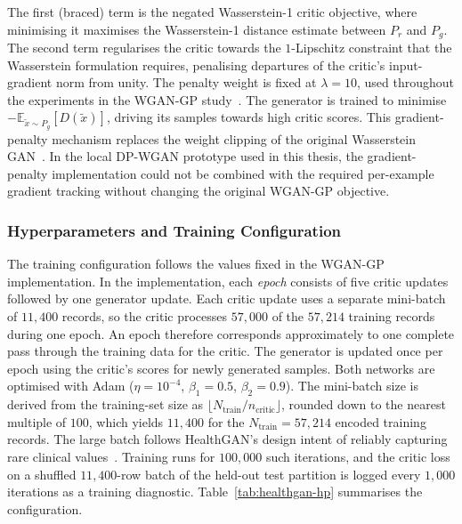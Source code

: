 The first (braced) term is the negated Wasserstein-1 critic objective, where
minimising it maximises the Wasserstein-1 distance estimate between $P_r$
and $P_g$. The second term regularises the critic towards the $1$-Lipschitz
constraint that the Wasserstein formulation requires, penalising departures
of the critic's input-gradient norm from unity. The penalty weight is fixed
at $\lambda = 10$, used throughout the
experiments in the WGAN-GP study~\cite{Gulrajani2017WGANGP}.
The generator is trained to minimise
$-\mathbb{E}_{\tilde{x}\sim P_g}\!\left[D(\tilde{x})\right]$, driving its
samples towards high critic scores. This
gradient-penalty mechanism replaces the weight clipping of the original
Wasserstein GAN~\cite{Arjovsky2017WGAN}. In the local DP-WGAN prototype used in this thesis, 
the gradient-penalty
implementation could not be combined with the required per-example gradient
tracking without changing the original WGAN-GP objective.

\subsubsection{Hyperparameters and Training Configuration}
\label{sec:methods:healthgan:hp}

The training configuration follows the values fixed in the WGAN-GP
implementation. In the implementation, each \emph{epoch} consists of five critic updates
followed by one generator update. Each critic update uses a separate
mini-batch of $11{,}400$ records, so the critic processes $57{,}000$ of the
$57{,}214$ training records during one epoch. An epoch therefore corresponds
approximately to one complete pass through the training data for the critic.
The generator is updated once per epoch using the critic's scores for newly
generated samples. Both networks are optimised
with Adam ($\eta = 10^{-4}$, $\beta_1 = 0.5$, $\beta_2 = 0.9$). The mini-batch
size is derived from the training-set size as
$\lfloor N_{\mathrm{train}}/n_{\mathrm{critic}}\rfloor$, rounded down to the
nearest multiple of $100$, which yields $11{,}400$ for the
$N_{\mathrm{train}} = 57{,}214$ encoded training records. The large batch
follows HealthGAN's design intent of reliably capturing rare clinical
values~\cite{healthgan}. Training runs for $100{,}000$ such iterations, and
the critic loss on a shuffled $11{,}400$-row batch of the held-out test
partition is logged every $1{,}000$ iterations as a training diagnostic.
Table~\ref{tab:healthgan-hp} summarises the configuration.

